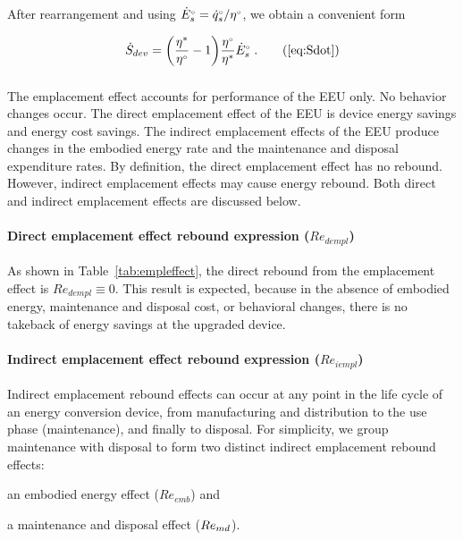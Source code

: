 After rearrangement and using ${}{\dot{E}}^{\scriptscriptstyle \circ}_s = {}{\dot{q}}^{\scriptscriptstyle \circ}_s/{}{\eta}^{\scriptscriptstyle \circ}$,
we obtain a convenient form

\begin{equation}
  \Sdot = \Sdoteqn \; .  \tag{\ref{eq:Sdot}}
\end{equation}


\subsubsection{\Empleffect{}}
\label{sec:Re_emp}

The emplacement effect accounts for performance of the EEU only.
No behavior changes occur.
The direct emplacement effect of the EEU is device energy savings and energy cost savings.
The indirect emplacement effects of the EEU produce changes in the embodied energy rate and
the maintenance and disposal expenditure rates.
By definition, the direct emplacement effect has no rebound.
However, indirect emplacement effects may cause energy rebound.
Both direct and indirect emplacement effects are discussed below.


\paragraph{Direct emplacement effect rebound expression ($Re_{dempl}$)}
\label{sec:Re_dempl}

As shown in Table~\ref{tab:empleffect},
the direct rebound from the emplacement effect is
$Re_{dempl} \equiv 0$.
This result is expected,
because in the absence of
embodied energy, maintenance and disposal cost, or behavioral changes,
there is no takeback of energy savings
at the upgraded device.


\paragraph{Indirect emplacement effect rebound expression ($Re_{iempl}$)}
\label{sec:Re_iempl}

Indirect emplacement rebound effects
can occur at any point in the life cycle of an energy conversion device,
from manufacturing and distribution
to the use phase (maintenance),
and finally to disposal.
For simplicity, we group maintenance with disposal to form
two distinct indirect emplacement rebound effects:
%
\begin{enumerate*}[label={(\roman*)}]

  \item an embodied energy effect ($Re_{emb}$) and

  \item a maintenance and disposal effect ($Re_{md}$).

\end{enumerate*}


